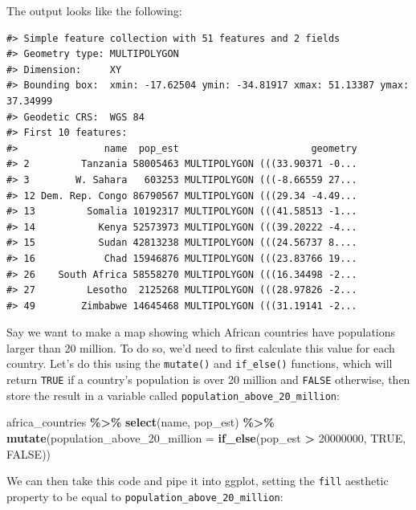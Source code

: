 \documentclass[
]{book}
\newenvironment{Shaded}{\begin{snugshade}}{\end{snugshade}}
\newcommand{\AttributeTok}[1]{\textcolor[rgb]{0.13,0.29,0.53}{#1}}
\newcommand{\ConstantTok}[1]{\textcolor[rgb]{0.56,0.35,0.01}{#1}}
\newcommand{\DecValTok}[1]{\textcolor[rgb]{0.00,0.00,0.81}{#1}}
\newcommand{\FunctionTok}[1]{\textcolor[rgb]{0.13,0.29,0.53}{\textbf{#1}}}
\newcommand{\NormalTok}[1]{#1}
\newcommand{\SpecialCharTok}[1]{\textcolor[rgb]{0.81,0.36,0.00}{\textbf{#1}}}
\begin{document}
The output looks like the following:

\begin{verbatim}
#> Simple feature collection with 51 features and 2 fields
#> Geometry type: MULTIPOLYGON
#> Dimension:     XY
#> Bounding box:  xmin: -17.62504 ymin: -34.81917 xmax: 51.13387 ymax: 37.34999
#> Geodetic CRS:  WGS 84
#> First 10 features:
#>               name  pop_est                       geometry
#> 2         Tanzania 58005463 MULTIPOLYGON (((33.90371 -0...
#> 3        W. Sahara   603253 MULTIPOLYGON (((-8.66559 27...
#> 12 Dem. Rep. Congo 86790567 MULTIPOLYGON (((29.34 -4.49...
#> 13         Somalia 10192317 MULTIPOLYGON (((41.58513 -1...
#> 14           Kenya 52573973 MULTIPOLYGON (((39.20222 -4...
#> 15           Sudan 42813238 MULTIPOLYGON (((24.56737 8....
#> 16            Chad 15946876 MULTIPOLYGON (((23.83766 19...
#> 26    South Africa 58558270 MULTIPOLYGON (((16.34498 -2...
#> 27         Lesotho  2125268 MULTIPOLYGON (((28.97826 -2...
#> 49        Zimbabwe 14645468 MULTIPOLYGON (((31.19141 -2...
\end{verbatim}

Say we want to make a map showing which African countries have populations larger than 20 million. To do so, we'd need to first calculate this value for each country. Let's do this using the \texttt{mutate()} and \texttt{if\_else()} functions, which will return \texttt{TRUE} if a country's population is over 20 million and \texttt{FALSE} otherwise, then store the result in a variable called \texttt{population\_above\_20\_million}:

\begin{Shaded}
\begin{Highlighting}[]
\NormalTok{africa\_countries }\SpecialCharTok{\%\textgreater{}\%}
  \FunctionTok{select}\NormalTok{(name, pop\_est) }\SpecialCharTok{\%\textgreater{}\%}
  \FunctionTok{mutate}\NormalTok{(}\AttributeTok{population\_above\_20\_million =} \FunctionTok{if\_else}\NormalTok{(pop\_est }\SpecialCharTok{\textgreater{}} \DecValTok{20000000}\NormalTok{, }\ConstantTok{TRUE}\NormalTok{, }\ConstantTok{FALSE}\NormalTok{))}
\end{Highlighting}
\end{Shaded}

We can then take this code and pipe it into ggplot, setting the \texttt{fill} aesthetic property to be equal to \texttt{population\_above\_20\_million}:
\end{document}
